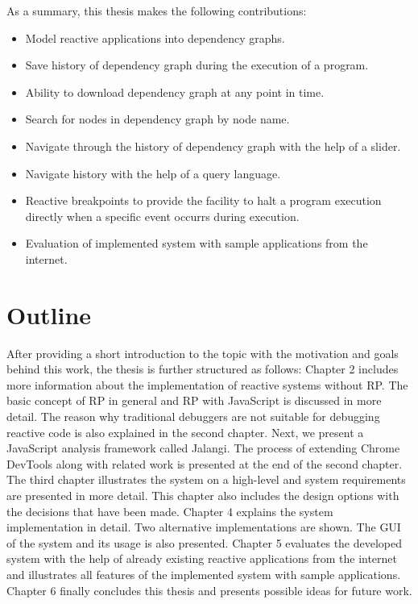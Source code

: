 As a summary, this thesis makes the following contributions:

\begin{itemize}

	\item Model reactive applications into dependency graphs.
	\item Save history of dependency graph during the execution of a program.
	\item Ability to download dependency graph at any point in time.
	\item Search for nodes in dependency graph by node name.
	\item Navigate through the history of dependency graph with the help of a slider.
	\item Navigate history with the help of a query language.
	\item Reactive breakpoints to provide the facility to halt a program execution directly when a specific event occurrs during execution.
	\item Evaluation of implemented system with sample applications from the internet.
	

\end{itemize}


\section{Outline}

After providing a short introduction to the topic with the motivation and goals behind this work, the thesis is further structured as follows: 
Chapter 2 includes more information about the implementation of reactive systems without RP. The basic concept of RP in general and RP with JavaScript is discussed in more detail. The reason why traditional debuggers are not suitable for debugging reactive code is also explained in the second chapter. Next, we present a JavaScript analysis framework called Jalangi. The process of extending Chrome DevTools along with related work is presented at the end of the second chapter. The third chapter illustrates the system on a high-level and system requirements are presented in more detail. This chapter also includes the design options with the decisions that have been made. Chapter 4 explains the system implementation in detail. Two alternative implementations are shown. The GUI of the system and its usage is also presented. Chapter 5 evaluates the developed system with the help of already existing reactive applications from the internet and illustrates all features of the implemented system with sample applications. Chapter 6 finally concludes this thesis and presents possible ideas for future work.

